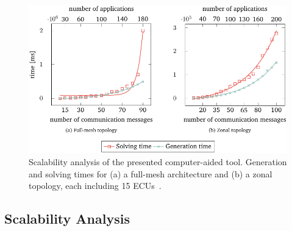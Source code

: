     
    
     \begin{figure}[ht]
    	\centering
    	\includegraphics[width=1\columnwidth]{figures/Scalability_analysis.pdf}
   	\caption{Scalability analysis of the presented computer-aided tool. Generation and solving times for (a) a full-mesh architecture and (b) a zonal topology, each including 15 ECUs~\cite{askaripoor2023designer}.} 
   		\label{fig74}
        \end{figure}
        
    \subsection{Scalability Analysis}

